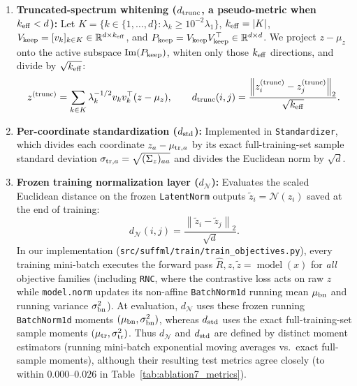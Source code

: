 \documentclass[preprint,11pt,a4paper]{elsarticle}
\newcommand{\R}{\mathbb{R}}
\newcommand{\norm}[1]{\left\lVert #1\right\rVert}
\begin{document}
\begin{enumerate}
\begin{equation}
    \end{equation}
    so $\alpha_{\rm reg}$ and $\delta$ coincide numerically only when $\bar\lambda=1$. As $\alpha_{\rm reg}\to 0$, $d_{\rm reg}(\alpha_{\rm reg})$ approaches unregularized ZCA whitening; as $\alpha_{\rm reg}\to\infty$, $d_{\rm reg}(\alpha_{\rm reg})$ becomes proportional to the raw Euclidean distance $\norm{z_i-z_j}_2/\sqrt d$ with scale factor $(\alpha_{\rm reg}\bar\lambda)^{-1/2}\to 0$.
    \item \textbf{Truncated-spectrum whitening ($d_{\rm trunc}$, a pseudo-metric when $k_{\rm eff}<d$):} Let $K=\{k\in\{1,\dots,d\} : \lambda_k\ge 10^{-2}\lambda_1\}$, $k_{\rm eff}=|K|$, $V_{\rm keep}=[v_k]_{k\in K}\in\R^{d\times k_{\rm eff}}$, and $P_{\rm keep}=V_{\rm keep}V_{\rm keep}^\top\in\R^{d\times d}$. We project $z-\mu_z$ onto the active subspace $\operatorname{Im}(P_{\rm keep})$, whiten only those $k_{\rm eff}$ directions, and divide by $\sqrt{k_{\rm eff}}$:
    \begin{equation}
    z^{({\rm trunc})} = \sum_{k\in K}\lambda_k^{-1/2}v_k v_k^\top(z-\mu_z),
    \qquad
    d_{\rm trunc}(i,j)=\frac{\norm{z_i^{({\rm trunc})}-z_j^{({\rm trunc})}}_2}{\sqrt{k_{\rm eff}}}.
    \label{eq:dtrunc}
    \end{equation}
    \item \textbf{Per-coordinate standardization ($d_{\rm std}$):} Implemented in \texttt{Standardizer}, which divides each coordinate $z_a-\mu_{{\rm tr},a}$ by its exact full-training-set sample standard deviation $\sigma_{{\rm tr},a}=\sqrt{(\Sigma_z)_{aa}}$ and divides the Euclidean norm by $\sqrt d$.
    \item \textbf{Frozen training normalization layer ($d_{\mathcal N}$):} Evaluates the scaled Euclidean distance on the frozen \texttt{LatentNorm} outputs $\tilde z_i=\mathcal N(z_i)$ saved at the end of training:
    \begin{equation}
    d_{\mathcal N}(i,j)=\frac{\norm{\tilde z_i-\tilde z_j}_2}{\sqrt d}.
    \label{eq:dN}
    \end{equation}
    In our implementation (\texttt{src/suffml/train/train\_objectives.py}), every training mini-batch executes the forward pass $\widehat R, z, \tilde z = \operatorname{model}(x)$ for \emph{all} objective families (including \texttt{RNC}, where the contrastive loss acts on raw $z$ while \texttt{model.norm} updates its non-affine \texttt{BatchNorm1d} running mean $\mu_{\rm bn}$ and running variance $\sigma_{\rm bn}^2$). At evaluation, $d_{\mathcal N}$ uses these frozen running \texttt{BatchNorm1d} moments $(\mu_{\rm bn},\sigma_{\rm bn}^2)$, whereas $d_{\rm std}$ uses the exact full-training-set sample moments $(\mu_{\rm tr},\sigma_{\rm tr}^2)$. Thus $d_{\mathcal N}$ and $d_{\rm std}$ are defined by distinct moment estimators (running mini-batch exponential moving averages vs.\ exact full-sample moments), although their resulting test metrics agree closely (to within $0.000\text{--}0.026$ in Table~\ref{tab:ablation7_metrics}).
\end{enumerate}
\end{document}
